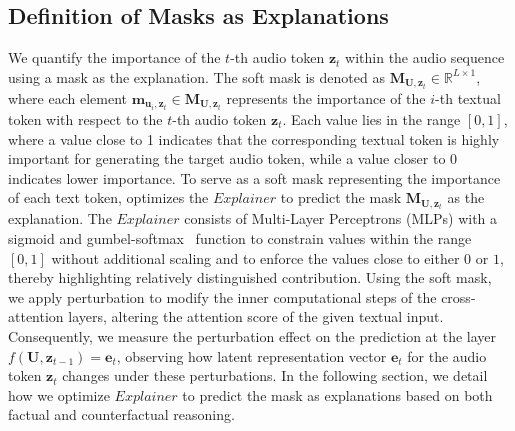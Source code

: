 \subsection{Definition of Masks as Explanations} 
We quantify the importance of the $t$-th audio token $\textbf{z}_{t}$ within the audio sequence using a mask as the explanation. The soft mask is denoted as $\textbf{M}_{\textbf{U}, \textbf{z}_{t}} \in \mathbb{R}^{L \times 1}$, where each element $\textbf{m}_{\textbf{u}_{i}, \textbf{z}_{t}} \in \textbf{M}_{\textbf{U}, \textbf{z}_{t}}$ represents the importance of the $i$-th textual token with respect to the $t$-th audio token $\textbf{z}_{t}$. Each value lies in the range $[0, 1]$, where a value close to 1 indicates that the corresponding textual token is highly important for generating the target audio token, while a value closer to 0 indicates lower importance. To serve as a soft mask representing the importance of each text token, \mname{} optimizes the $Explainer$ to predict the mask $\textbf{M}_{\textbf{U}, \textbf{z}_{t}}$ as the explanation. The $Explainer$ consists of Multi-Layer Perceptrons (MLPs) with a sigmoid and gumbel-softmax~\cite{jang2016categorical} function to constrain values within the range $[0, 1]$ without additional scaling and to enforce the values close to either $0$ or $1$, thereby highlighting relatively distinguished contribution. Using the soft mask, we apply perturbation to modify the inner computational steps of the cross-attention layers, altering the attention score of the given textual input. Consequently, we measure the perturbation effect on the prediction at the layer $f(\textbf{U}, \textbf{z}_{t-1}) = \textbf{e}_{t}$, observing how latent representation vector $\textbf{e}_{t}$ for the audio token $\textbf{z}_{t}$ changes under these perturbations. In the following section, we detail how we optimize $Explainer$ to predict the mask as explanations based on both factual and counterfactual reasoning.
